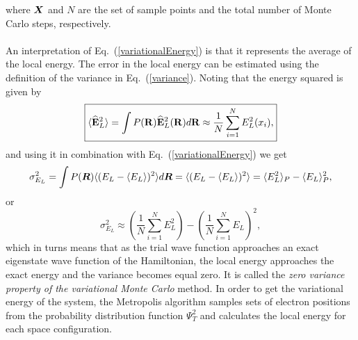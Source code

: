 where $\boldsymbol{X}$  and $N$ are the set of sample points and the total number of Monte Carlo steps, respectively. \\
\\
\noindent
An interpretation of Eq.~(\ref{variationalEnergy}) is that it represents the average of the local energy. 
The error in the local energy can be estimated using the definition of the variance in Eq.~(\ref{variance}). Noting that the energy squared is given by
\begin{equation}
 \boxed{\langle {\bf\widehat{E}}_L^2 \rangle =\int P({\bf R}){\bf\widehat{E}}_L^2({\bf R}) d{\bf R}\approx 
  \frac{1}{N}\sum_{i=1}^{N}E_L^2(x_i),}
\end{equation} and using it in combination with Eq.~(\ref{variationalEnergy}) we get
\begin{equation}\label{zeroVarianceProperty}
 \sigma^{2}_{E_L} = \int P({\boldsymbol{R}}) \langle(E_L - \langle E_L \rangle)^2\rangle d{\boldsymbol{R}}  = \langle(E_L - \langle E_L \rangle)^2\rangle = \langle E_{L}^2 \rangle_P - \langle E_L \rangle_{P}^2,
\end{equation}
or 
\begin{equation}
\boxed{ \sigma^{2}_{E_L} \approx \left(\frac{1}{N}\sum_{i=1}^{N} E_{L}^{2}\right) - \left(\frac{1}{N} \sum_{i=1}^{N} E_{L}\right)^2,}
\end{equation}
which in turns means that as the trial wave function approaches an exact eigenstate wave function of the Hamiltonian, the local energy approaches the exact energy and the variance becomes equal zero. It is called the \emph{zero variance property of the variational Monte Carlo} method. In order to get the variational energy of the system, the Metropolis algorithm samples sets of electron positions from the probability distribution function $\Psi_{T}^{2}$ and calculates the local energy for each space configuration. 




